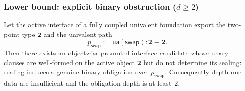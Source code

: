 \documentclass{lmcs}
\begin{document}
\subsubsection{\texorpdfstring{Lower bound: explicit binary obstruction ($d \geq 2$)}{Lower bound}}

\begin{thm}
\label{thm:adjunction}
\label{thm:primitive-depth-lower-bound}
Let the active interface of a fully coupled univalent foundation export the two-point type $\mathbf{2}$ and the univalent path
\[
  p_{\mathsf{swap}} := \mathsf{ua}(\mathsf{swap}) : \mathbf{2} \equiv \mathbf{2}.
\]
Then there exists an objectwise promoted-interface candidate whose unary clauses are well-formed on the active object $\mathbf{2}$ but do not determine its sealing: sealing induces a genuine binary obligation over~$p_{\mathsf{swap}}$. Consequently depth-one data are insufficient and the obligation depth is at least~$2$.
\end{thm}
\end{document}
